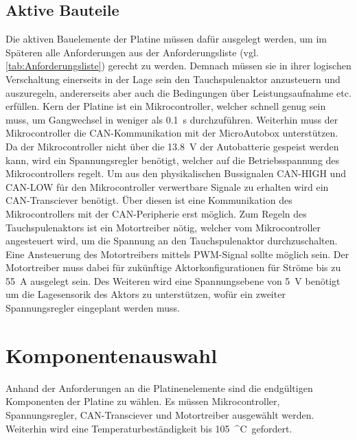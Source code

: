 \subsection{Aktive Bauteile}
Die aktiven Bauelemente der Platine müssen dafür ausgelegt werden, um im Späteren alle Anforderungen aus der Anforderungsliste (vgl. \autoref{tab:Anforderungsliste}) gerecht zu werden. Demnach müssen sie in ihrer logischen Verschaltung einerseits in der Lage sein den Tauchspulenaktor anzusteuern und auszuregeln, andererseits aber auch die Bedingungen über Leistungsaufnahme etc. erfüllen. Kern der Platine ist ein Mikrocontroller, welcher schnell genug sein muss, um Gangwechsel in weniger als \SI{0,1}{s} durchzuführen. Weiterhin muss der Mikrocontroller die CAN-Kommunikation mit der MicroAutobox unterstützen. Da der Mikrocontroller nicht über die \SI{13,8}{V} der Autobatterie gespeist werden kann, wird ein Spannungsregler benötigt, welcher auf die Betriebsspannung des Mikrocontrollers regelt. Um aus den physikalischen Bussignalen CAN-HIGH und CAN-LOW für den Mikrocontroller verwertbare Signale zu erhalten wird ein CAN-Transciever benötigt. Über diesen ist eine Kommunikation des Mikrocontrollers mit der CAN-Peripherie erst möglich. Zum Regeln des Tauchspulenaktors ist ein Motortreiber nötig, welcher vom Mikrocontroller angesteuert wird, um die Spannung an den Tauchspulenaktor durchzuschalten. Eine Ansteuerung des Motortreibers mittels PWM-Signal sollte möglich sein. Der Motortreiber muss dabei für zukünftige Aktorkonfigurationen für Ströme bis zu \SI{55}{A} ausgelegt sein. Des Weiteren wird eine Spannungsebene von \SI{5}{V} benötigt um die Lagesensorik des Aktors zu unterstützen, wofür ein zweiter Spannungsregler eingeplant werden muss.
\newpage
\section{Komponentenauswahl}
Anhand der Anforderungen an die Platinenelemente sind die endgültigen Komponenten der Platine zu wählen. Es müssen Mikrocontroller, Spannungsregler, CAN-Transciever und Motortreiber ausgewählt werden. Weiterhin wird eine Temperaturbeständigkeit bis \SI{105}{^\circ C} gefordert.
